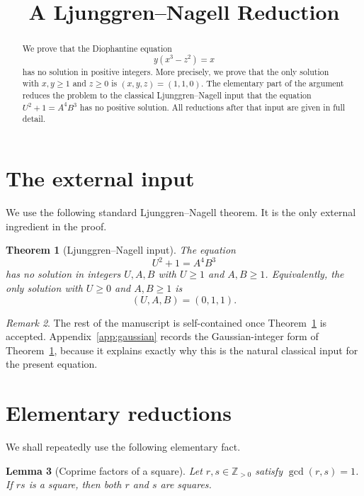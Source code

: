 \documentclass[a4paper,11pt]{amsart}
\title[A Ljunggren--Nagell Reduction]{A Ljunggren--Nagell Reduction}
\author{}
\date{}
\newtheorem{theorem}{Theorem}[section]
\newtheorem{lemma}[theorem]{Lemma}
\theoremstyle{remark}
\newtheorem{remark}[theorem]{Remark}
\newcommand{\Z}{\mathbb Z}
\begin{document}
\begin{abstract}
We prove that the Diophantine equation
\[
        y(x^3-z^2)=x
\]
has no solution in positive integers.  More precisely, we prove that the only
solution with $x,y\geq 1$ and $z\geq 0$ is $(x,y,z)=(1,1,0)$.  The elementary
part of the argument reduces the problem to the classical Ljunggren--Nagell
input that the equation $U^2+1=A^4B^3$ has no positive solution.  All
reductions after that input are given in full detail.
\end{abstract}

\maketitle

\section{The external input}

We use the following standard Ljunggren--Nagell theorem.  It is the only
external ingredient in the proof.

\begin{theorem}[Ljunggren--Nagell input]\label{thm:LN}
The equation
\[
        U^2+1=A^4B^3
\]
has no solution in integers $U,A,B$ with $U\geq 1$ and $A,B\geq 1$.  Equivalently,
the only solution with $U\geq0$ and $A,B\geq1$ is
\[
        (U,A,B)=(0,1,1).
\]
\end{theorem}

\begin{remark}
The rest of the manuscript is self-contained once Theorem~\ref{thm:LN} is
accepted.  Appendix~\ref{app:gaussian} records the Gaussian-integer form of
Theorem~\ref{thm:LN}, because it explains exactly why this is the natural
classical input for the present equation.
\end{remark}

\section{Elementary reductions}

We shall repeatedly use the following elementary fact.

\begin{lemma}[Coprime factors of a square]\label{lem:coprime-square}
Let $r,s\in\Z_{>0}$ satisfy $\gcd(r,s)=1$.  If $rs$ is a square, then both
$r$ and $s$ are squares.
\end{lemma}
\end{document}
